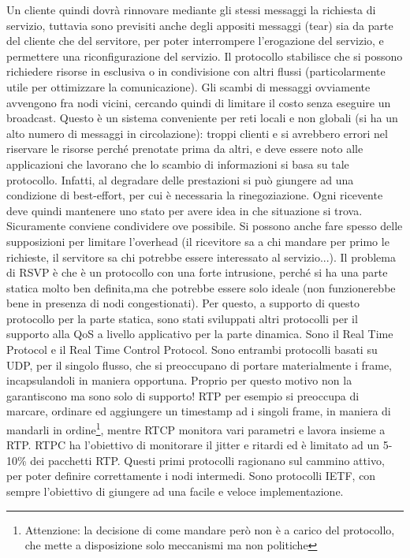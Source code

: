 Un cliente quindi dovrà rinnovare mediante gli stessi messaggi la richiesta di servizio, tuttavia sono previsiti anche
degli appositi messaggi (tear) sia da parte del cliente che del servitore, per poter interrompere l'erogazione del
servizio, e permettere una riconfigurazione del servizio. Il protocollo stabilisce che si possono richiedere risorse
in esclusiva o in condivisione con altri flussi (particolarmente utile per ottimizzare la comunicazione). Gli scambi
di messaggi ovviamente avvengono fra nodi vicini, cercando quindi di limitare il costo senza eseguire un broadcast.
Questo è un sistema conveniente per reti locali e non globali (si ha un alto numero di messaggi in circolazione):
troppi clienti e si avrebbero errori nel riservare le risorse perché prenotate prima da altri, e deve essere noto alle applicazioni che lavorano che lo scambio di informazioni si basa su tale protocollo. Infatti, al degradare delle
prestazioni si può giungere ad una condizione di best-effort, per cui è necessaria la rinegoziazione. Ogni ricevente
deve quindi mantenere uno stato per avere idea in che situazione si trova. Sicuramente conviene condividere ove
possibile. Si possono anche fare spesso delle supposizioni per limitare l'overhead (il ricevitore sa a chi mandare per
primo le richieste, il servitore sa chi potrebbe essere interessato al servizio...).
Il problema di RSVP è che è un protocollo con una forte intrusione, perché si ha una parte statica molto ben definita,ma che potrebbe essere solo ideale (non funzionerebbe bene in presenza di nodi congestionati). Per questo, a supporto di questo protocollo per la parte statica, sono stati sviluppati altri protocolli per il supporto alla QoS a livello applicativo per la parte dinamica. Sono il Real Time Protocol e il Real Time Control Protocol. Sono entrambi protocolli basati su UDP, per il singolo flusso, che si preoccupano di portare materialmente i frame, incapsulandoli in maniera opportuna. Proprio per questo motivo non la garantiscono ma sono solo di supporto! RTP per esempio si preoccupa di marcare, ordinare ed aggiungere un timestamp ad i singoli frame, in maniera di mandarli in ordine\footnote{Attenzione: la decisione di come mandare però non è a carico del protocollo, che mette a disposizione solo meccanismi ma non politiche}, mentre RTCP monitora vari parametri e lavora insieme a RTP. RTPC ha l'obiettivo di monitorare il jitter e ritardi ed è limitato ad un 5-10\% dei pacchetti RTP. Questi primi protocolli ragionano sul cammino attivo, per poter definire correttamente i nodi intermedi. Sono protocolli IETF, con sempre l'obiettivo di giungere ad una facile e veloce implementazione.
